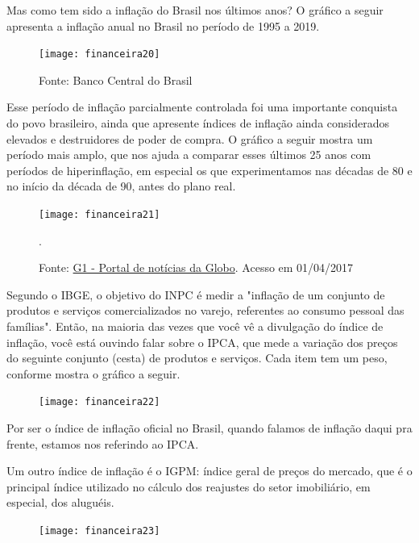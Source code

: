 Mas como tem sido a inflação do Brasil nos últimos anos? O gráfico a seguir apresenta a inflação anual no Brasil no período de 1995 a 2019.

\begin{figure}[H]
\centering

\texttt{[image: financeira20]}

\caption{Fonte: Banco Central do Brasil}
\end{figure}

Esse período de inflação parcialmente controlada foi uma importante conquista do povo brasileiro, ainda que apresente índices de inflação ainda considerados elevados e destruidores de poder de compra. O gráfico a seguir mostra um período mais amplo, que nos ajuda a comparar esses últimos 25 anos com períodos de hiperinflação, em especial os que experimentamos nas décadas de 80 e no início da década de 90, antes do plano real.

\begin{figure}[H]
\centering

\texttt{[image: financeira21]}

\caption{Fonte: \href{http://g1.globo.com/economia/inflacao-o-que-e/platb}{G1 - Portal de notícias da Globo}. Acesso em 01/04/2017}.
\label{}
\end{figure}

Segundo o IBGE, o objetivo do INPC é medir a "inflação de um conjunto de produtos e serviços comercializados no varejo, referentes ao consumo pessoal das famílias". Então, na maioria das vezes que você vê a divulgação do índice de inflação, você está ouvindo falar sobre o IPCA, que mede a variação dos preços do seguinte conjunto (cesta) de produtos e serviços. Cada item tem um peso, conforme mostra o gráfico a seguir.

\begin{figure}[H]
\centering

\texttt{[image: financeira22]}
\end{figure}

Por ser o índice de inflação oficial no Brasil, quando falamos de inflação daqui pra frente, estamos nos referindo ao IPCA.

Um outro índice de inflação é o IGPM: índice geral de preços do mercado, que é o principal índice utilizado no cálculo dos reajustes do setor imobiliário, em especial, dos aluguéis.

\begin{figure}[H]
\centering

\texttt{[image: financeira23]}
\end{figure}

